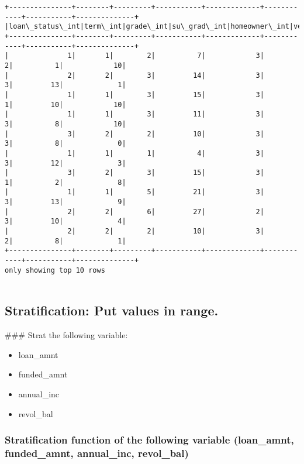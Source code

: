 \documentclass[11pt]{article}
\providecommand{\tightlist}{%
      \setlength{\itemsep}{0pt}\setlength{\parskip}{0pt}}
\begin{document}
    \begin{Verbatim}[commandchars=\\\{\}]
+---------------+--------+---------+-----------+-------------+------------+-----------+--------------+
|loan\_status\_int|term\_int|grade\_int|su\_grad\_int|homeowner\_int|veri\_sta\_int|purpose\_int|emp\_length\_int|
+---------------+--------+---------+-----------+-------------+------------+-----------+--------------+
|              1|       1|        2|          7|            3|           2|          1|            10|
|              2|       2|        3|         14|            3|           3|         13|             1|
|              1|       1|        3|         15|            3|           1|         10|            10|
|              1|       1|        3|         11|            3|           3|          8|            10|
|              3|       2|        2|         10|            3|           3|          8|             0|
|              1|       1|        1|          4|            3|           3|         12|             3|
|              3|       2|        3|         15|            3|           1|          2|             8|
|              1|       1|        5|         21|            3|           3|         13|             9|
|              2|       2|        6|         27|            2|           3|         10|             4|
|              2|       2|        2|         10|            3|           2|          8|             1|
+---------------+--------+---------+-----------+-------------+------------+-----------+--------------+
only showing top 10 rows


    \end{Verbatim}

    \hypertarget{stratification-put-values-in-range.}{%
\subsection{Stratification: Put values in
range.}\label{stratification-put-values-in-range.}}

\#\#\# Strat the following variable:

\begin{itemize}
\tightlist
\item
  loan\_amnt
\item
  funded\_amnt
\item
  annual\_inc
\item
  revol\_bal
\end{itemize}

    \hypertarget{stratification-function-of-the-following-variable-loan_amnt-funded_amnt-annual_inc-revol_bal}{%
\subsubsection{Stratification function of the following variable
(loan\_amnt, funded\_amnt, annual\_inc,
revol\_bal)}\label{stratification-function-of-the-following-variable-loan_amnt-funded_amnt-annual_inc-revol_bal}}
\end{document}
